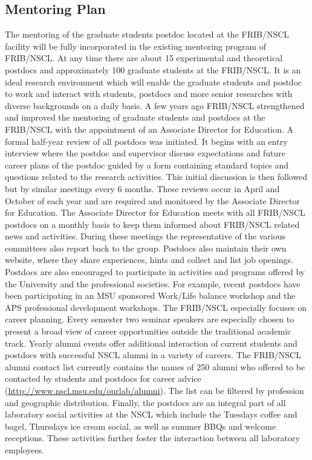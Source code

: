 \documentclass[10pt]{article}
\begin{document}
\subsection{Mentoring Plan}

The mentoring of the graduate students postdoc located at the
FRIB/NSCL facility will be fully incorporated in the existing
mentoring program of FRIB/NSCL. At any time there are about 15
experimental and theoretical postdocs and approximately 100 graduate
students at the FRIB/NSCL. It is an ideal research environment which
will enable the graduate students and postdoc to work and interact
with students, postdocs and more senior researches with diverse
backgrounds on a daily basis. A few years ago FRIB/NSCL strengthened
and improved the mentoring of graduate students and postdocs at the
FRIB/NSCL with the appointment of an Associate Director for
Education. A formal half-year review of all postdocs was initiated. It
begins with an entry interview where the postdoc and supervisor
discuss expectations and future career plans of the postdoc guided by
a form containing standard topics and questions related to the
research activities. This initial discussion is then followed but by
similar meetings every 6 months. These reviews occur in April and
October of each year and are required and monitored by the Associate
Director for Education.  The Associate Director for Education meets
with all FRIB/NSCL postdocs on a monthly basis to keep them informed
about FRIB/NSCL related news and activities. During these meetings the
representative of the various committees also report back to the
group. Postdocs also maintain their own website, where they share
experiences, hints and collect and list job openings. Postdocs are
also encouraged to participate in activities and programs offered by
the University and the professional societies. For example, recent
postdocs have been participating in an MSU sponsored Work/Life balance
workshop and the APS professional development workshops. The FRIB/NSCL
especially focuses on career planning. Every semester two seminar
speakers are especially chosen to present a broad view of career
opportunities outside the traditional academic track. Yearly alumni
events offer additional interaction of current students and postdocs
with successful NSCL alumni in a variety of careers.  The FRIB/NSCL
alumni contact list currently contains the names of 250 alumni who
offered to be contacted by students and postdocs for career advice
(\url{http://www.nscl.msu.edu/ourlab/alumni}).  The list can be
filtered by profession and geographic distribution.  Finally, the
postdocs are an integral part of all laboratory social activities at
the NSCL which include the Tuesdays coffee and bagel, Thursdays ice
cream social, as well as summer BBQs and welcome receptions. These
activities further foster the interaction between all laboratory
employees.
\end{document}
